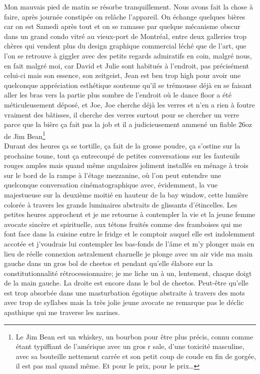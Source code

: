 Mon mauvais pied de matin se résorbe tranquillement. Nous avons fait la chose à faire,
après journée constipée on relâche l'appareil. On échange quelques bières car
on est Samedi après tout et on se ramasse par quelque mécanisme obscur dans un
grand condo vitré au vieux-port de Montréal, entre deux galleries trop chères
qui vendent plus du design graphique commercial léché que de l'art, que l'on
se retrouve à giggler avec des petits regards admiratifs en coin, malgré nous, en
fait malgré moi, car David et Julie sont habitués à l'endroit, pas précisément
celui-ci mais son essence, son zeitgeist, Jean est ben trop high pour avoir 
une quelconque appréciation esthétique soutenue qu'il se trémousse déjà en 
se faisant aller les bras vers la partie plus sombre de l'endroit où le dance
floor a été méticuleusement déposé, et Joe, Joe cherche déjà les verres et n'en 
a rien à foutre vraiment des bâtisses, il cherche des verres surtout pour se
chercher un verre parce que la bière ça fait pas la job et il a judicieusement
ammené un fiable 26oz de Jim Bean\footnote{Le Jim Bean est un whiskey, un
bourbon pour être plus précis, connu comme étant typiffiant de
l'amérique avec un gros r sale, d'une toxicité masculine, avec sa bouteille
nettement carrée et son petit coup de coude en fin de gorgée, il est pas mal
quand même. Et pour le prix, pour le prix\ldots}\\
\clearpage
Durant des heures ça se
tortille, ça fait de la grosse poudre, ça s'ostine sur la prochaine toune, tout
ça entrecoupé de petites conversations sur les fauteuils rouges amples mais
quand même angulaires joliment installés en ménage à trois sur le bord de la
rampe à l'étage mezzanine, où l'on peut entendre une quelconque conversation
cinématographique avec, évidemment, la vue majestueuse sur la deuxième
moitié en hauteur de la bay window, cette lumière colorée à travers les
grands luminaires abstraits de glissants d'étincelles. Les
petites heures approchent et je me retourne à contempler la vie et la jeune
femme avocate sincère et spirituelle, aux tétons fruités comme des framboises
qui me font face dans la cuisine entre le fridge et le comptoir auquel elle est
indolemment accotée et j'voudrais lui contempler les bas-fonds de l'âme et m'y
plonger mais en lieu de réelle connexion astralement charnelle je plonge avec
un air vide ma main gauche dans un gros bol de cheetos et pendant qu'elle
élabore sur la constitutionnalité
rétrocessionnaire; je me liche un à un, lentement, chaque doigt de la main
gauche.  La droite est encore dans le bol de cheetos.  Peut-être qu'elle est
trop absorbée dans une masturbation égotique abstraite à travers des mots avec
trop de syllabes mais la très jolie jeune avocate ne remarque pas le déclic
apathique qui me traverse les narines.\\

